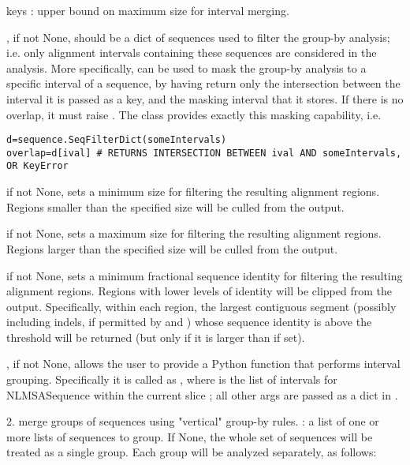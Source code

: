 \documentclass{howto}
\begin{document}
\begin{funcdesc}{keys}
  : upper bound on maximum size for interval merging.

  , if not None, should be a dict of sequences
  used to filter the group-by analysis; i.e. only alignment intervals 
  containing these sequences are considered in the analysis.  More
  specifically,  can be used to mask the group-by analysis
  to a specific interval of a sequence, by having 
  return only the intersection between the interval it is passed as a key,
  and the masking interval that it stores.  If there is no overlap, it
  must raise .  The  class
  provides exactly this masking capability, i.e.
\begin{verbatim}
d=sequence.SeqFilterDict(someIntervals)
overlap=d[ival] # RETURNS INTERSECTION BETWEEN ival AND someIntervals, OR KeyError
\end{verbatim}
   if not None, sets a minimum size for filtering the resulting
  alignment regions.  Regions smaller than the specified size will be culled
  from the output.  

   if not None, sets a maximum size for filtering the resulting
  alignment regions.  Regions larger than the specified size will be culled
  from the output.  

   if not None, sets a minimum fractional sequence identity
  for filtering the resulting alignment regions.  Regions with lower levels
  of identity will be clipped from the output.  Specifically, within each
  region, the largest contiguous segment (possibly including indels, if
  permitted by  and ) whose sequence identity is above the
  threshold will be returned (but only if it is larger than 
  if set).  

  ,
  if not None, allows the user to provide a Python function that performs
  interval grouping.  Specifically it is called as
  , where  is the
  list of intervals for NLMSASequence  within the current slice 
  ; all other args are passed as a dict in .

  2. merge groups of sequences using "vertical" group-by rules.
  : a list of one or more lists of sequences to group.
  If None, the whole set of sequences will be treated as a single group.
  Each group will be analyzed separately, as follows:


\end{funcdesc}
\end{document}
